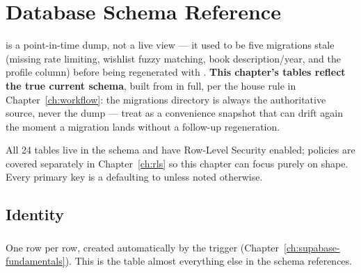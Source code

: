 \chapter{Database Schema Reference}
\label{ch:schema}

\begin{olknote}
 is a point-in-time dump, not a live view — it used to be five migrations stale (missing rate limiting, wishlist fuzzy matching, book description/year, and the profile  column) before being regenerated with . \textbf{This chapter's tables reflect the true current schema}, built from  in full, per the house rule in Chapter~\ref{ch:workflow}: the migrations directory is always the authoritative source, never the dump — treat  as a convenience snapshot that can drift again the moment a migration lands without a follow-up regeneration.
\end{olknote}

All 24 tables live in the  schema and have Row-Level Security enabled; policies are covered separately in Chapter~\ref{ch:rls} so this chapter can focus purely on shape. Every primary key is a  defaulting to  unless noted otherwise.

\section{Identity}

\subsection*{}
One row per  row, created automatically by the  trigger (Chapter~\ref{ch:supabase-fundamentals}). This is the table almost everything else in the schema references.

